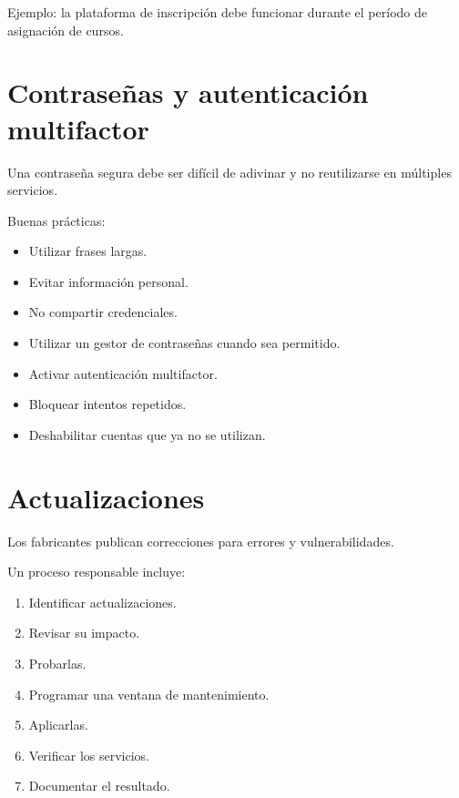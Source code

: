 \documentclass[
  spanish,
  letterpaper,
]{scrbook}
\providecommand{\tightlist}{%
  \setlength{\itemsep}{0pt}\setlength{\parskip}{0pt}}
\begin{document}
Ejemplo: la plataforma de inscripción debe funcionar durante el período
de asignación de cursos.


\chapter{Contraseñas y autenticación
multifactor}\label{contraseuxf1as-y-autenticaciuxf3n-multifactor}

Una contraseña segura debe ser difícil de adivinar y no reutilizarse en
múltiples servicios.

Buenas prácticas:

\begin{itemize}
\tightlist
\item
  Utilizar frases largas.
\item
  Evitar información personal.
\item
  No compartir credenciales.
\item
  Utilizar un gestor de contraseñas cuando sea permitido.
\item
  Activar autenticación multifactor.
\item
  Bloquear intentos repetidos.
\item
  Deshabilitar cuentas que ya no se utilizan.
\end{itemize}


\chapter{Actualizaciones}\label{actualizaciones}

Los fabricantes publican correcciones para errores y vulnerabilidades.

Un proceso responsable incluye:

\begin{enumerate}
\def\labelenumi{\arabic{enumi}.}
\tightlist
\item
  Identificar actualizaciones.
\item
  Revisar su impacto.
\item
  Probarlas.
\item
  Programar una ventana de mantenimiento.
\item
  Aplicarlas.
\item
  Verificar los servicios.
\item
  Documentar el resultado.
\end{enumerate}
\end{document}
